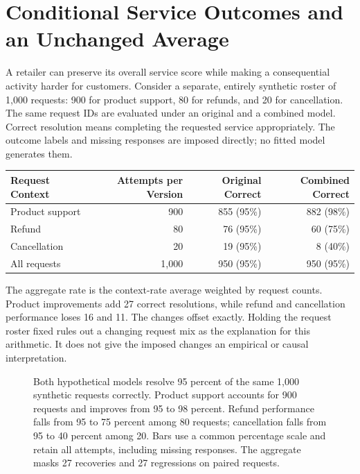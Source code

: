 
\hypertarget{M07-conditional-service-outcomes-and-an-unchanged-average}{%
\section{Conditional Service Outcomes and an Unchanged
Average}\label{M07-conditional-service-outcomes-and-an-unchanged-average}}

\noindent \noindent A retailer can preserve its overall service score while making
a consequential activity harder for customers. Consider a separate,
entirely synthetic roster of 1,000 requests: 900 for product support, 80
for refunds, and 20 for cancellation. The same request IDs are evaluated
under an original and a combined model. Correct resolution means
completing the requested service appropriately. The outcome labels and
missing responses are imposed directly; no fitted model generates them.

\begin{table}[H]
\centering\small
\begin{tabular}{@{}lrrr@{}}
\toprule
Request Context & Attempts per Version & Original Correct & Combined
Correct \\
\midrule

Product support & 900 & 855 (95\%) & 882 (98\%) \\
Refund & 80 & 76 (95\%) & 60 (75\%) \\
Cancellation & 20 & 19 (95\%) & 8 (40\%) \\
All requests & 1,000 & 950 (95\%) & 950 (95\%) \\
\bottomrule
\end{tabular}
\end{table}

The aggregate rate is the context-rate average weighted by request
counts. Product improvements add 27 correct resolutions, while refund
and cancellation performance loses 16 and 11. The changes offset
exactly. Holding the request roster fixed rules out a changing request
mix as the explanation for this arithmetic. It does not give the imposed
changes an empirical or causal interpretation.

\begin{figure}[htbp]
\centering

\caption{Both hypothetical models resolve 95 percent of the same 1,000 synthetic requests correctly. Product support accounts for 900 requests and improves from 95 to 98 percent. Refund performance falls from 95 to 75 percent among 80 requests; cancellation falls from 95 to 40 percent among 20. Bars use a common percentage scale and retain all attempts, including missing responses. The aggregate masks 27 recoveries and 27 regressions on paired requests.}\label{fig:M07_conditional_service}
\end{figure}

